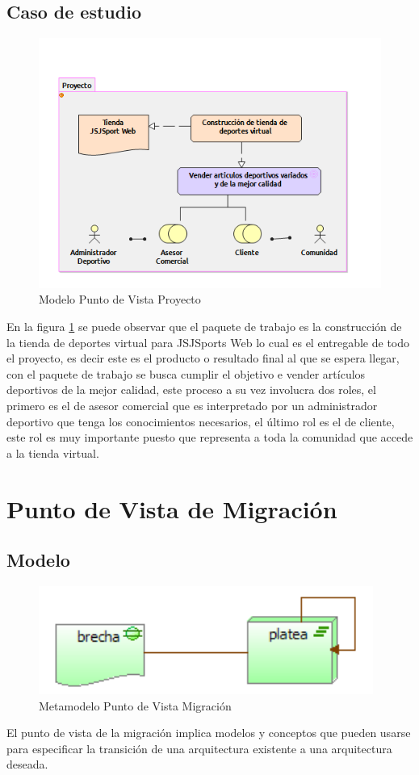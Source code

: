 \subsection{Caso de estudio}

\begin{figure}[th!]
	\centering
	\includegraphics[width=0.8\linewidth]{arquitectura/imagenes/PuntoVistaProyecto}
	\caption{Modelo Punto de Vista Proyecto}
	\label{modelo proyecto}
\end{figure}

En la figura \ref{modelo proyecto} se puede observar que el paquete de trabajo es la construcción de la tienda de deportes virtual para JSJSports Web lo cual es el entregable de todo el proyecto, es decir este es el producto o resultado final al que se espera llegar, con el paquete de trabajo se busca cumplir el objetivo e vender artículos deportivos de la mejor calidad, este proceso a su vez involucra dos roles, el primero es el de asesor comercial que es interpretado por un administrador deportivo que tenga los conocimientos necesarios, el último rol es el de cliente, este rol es muy importante puesto que representa a toda la comunidad que accede a la tienda virtual.

\newpage

\section{Punto de Vista de Migración}

\subsection{Modelo}

\begin{figure}[th!]
	\centering
	\includegraphics[width=0.8\linewidth]{arquitectura/imagenes/modeloMigracion}
	\caption{Metamodelo Punto de Vista Migración}
	\label{metamodelo migracion}
\end{figure}
El punto de vista de la migración implica modelos y conceptos que pueden usarse para especificar la transición de una arquitectura existente a una arquitectura deseada.

